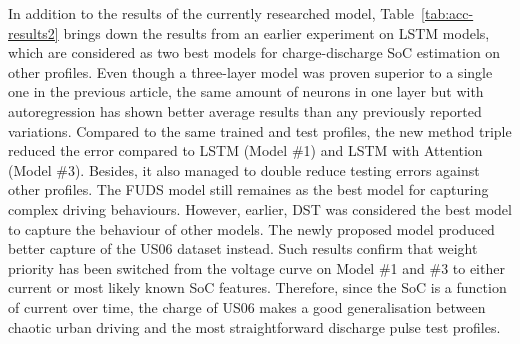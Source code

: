 %
%
In addition to the results of the currently researched model, Table~\ref{tab:acc-results2} brings down the results from an earlier experiment on LSTM models, which are considered as two best models for charge-discharge SoC estimation on other profiles.
Even though a three-layer model was proven superior to a single one in the previous article, the same amount of neurons in one layer but with autoregression has shown better average results than any previously reported variations.
Compared to the same trained and test profiles, the new method triple reduced the error compared to LSTM (Model \#1) and LSTM with Attention (Model \#3).
Besides, it also managed to double reduce testing errors against other profiles.
The FUDS model still remaines as the best model for capturing complex driving behaviours.
However, earlier, DST was considered the best model to capture the behaviour of other models.
The newly proposed model produced better capture of the US06 dataset instead.
Such results confirm that weight priority has been switched from the voltage curve on Model \#1 and \#3 to either current or most likely known SoC features.
Therefore, since the SoC is a function of current over time, the charge of US06 makes a good generalisation between chaotic urban driving and the most straightforward discharge pulse test profiles.
